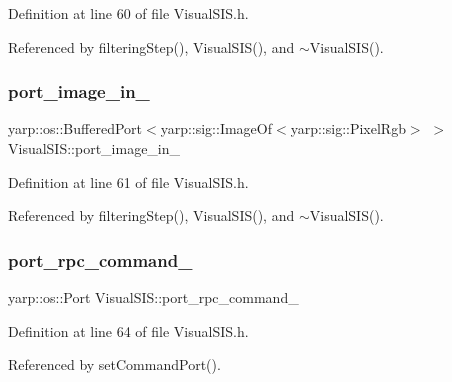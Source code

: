 Definition at line 60 of file Visual\+S\+I\+S.\+h.



Referenced by filtering\+Step(), Visual\+S\+I\+S(), and $\sim$\+Visual\+S\+I\+S().

\mbox{\label{classVisualSIS_ac45684c34e7413a13b6ed301cd8a7aa1}} 
\subsubsection{\texorpdfstring{port\+\_\+image\+\_\+in\+\_\+}{port\_image\_in\_}}
{\footnotesize\ttfamily yarp\+::os\+::\+Buffered\+Port$<$yarp\+::sig\+::\+Image\+Of$<$yarp\+::sig\+::\+Pixel\+Rgb$>$ $>$ Visual\+S\+I\+S\+::port\+\_\+image\+\_\+in\+\_\+\hspace{0.3cm}{\ttfamily [protected]}}



Definition at line 61 of file Visual\+S\+I\+S.\+h.



Referenced by filtering\+Step(), Visual\+S\+I\+S(), and $\sim$\+Visual\+S\+I\+S().

\mbox{\label{classVisualSIS_ac08ca49836aaad57b7d5f7240a6d1ca5}} 
\subsubsection{\texorpdfstring{port\+\_\+rpc\+\_\+command\+\_\+}{port\_rpc\_command\_}}
{\footnotesize\ttfamily yarp\+::os\+::\+Port Visual\+S\+I\+S\+::port\+\_\+rpc\+\_\+command\+\_\+\hspace{0.3cm}{\ttfamily [protected]}}



Definition at line 64 of file Visual\+S\+I\+S.\+h.



Referenced by set\+Command\+Port().

\mbox{\label{classVisualSIS_accd71e6f7ced897e5b61e3b6c01243d4}} 
